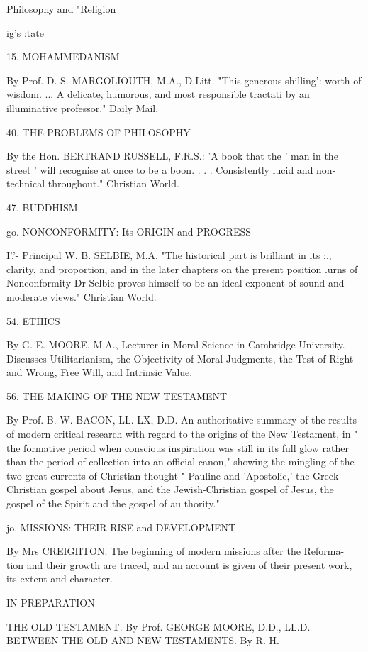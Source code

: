 \documentclass[12pt,leqno]{book}[2005/09/16]
\begin{document}
Philosophy and "Religion



ig's
:tate



15. MOHAMMEDANISM

By Prof. D. S. MARGOLIOUTH, M.A., D.Litt. "This generous shilling':
worth of wisdom. ... A delicate, humorous, and most responsible tractati
by an illuminative professor." Daily Mail.

40. THE PROBLEMS OF PHILOSOPHY

By the Hon. BERTRAND RUSSELL, F.R.S.: 'A book that the ' man in the
street ' will recognise at once to be a boon. . . . Consistently lucid and non-
technical throughout." Christian World.

47. BUDDHISM



go. NONCONFORMITY: Its ORIGIN and PROGRESS

I'.'- Principal W. B. SELBIE, M.A. "The historical part is brilliant in its
:., clarity, and proportion, and in the later chapters on the present position
.urns of Nonconformity Dr Selbie proves himself to be an ideal exponent
of sound and moderate views." Christian World.

54. ETHICS

By G. E. MOORE, M.A., Lecturer in Moral Science in Cambridge University.
Discusses Utilitarianism, the Objectivity of Moral Judgments, the Test of
Right and Wrong, Free Will, and Intrinsic Value.

56. THE MAKING OF THE NEW TESTAMENT

By Prof. B. W. BACON, LL. LX, D.D. An authoritative summary of the results
of modern critical research with regard to the origins of the New Testament, in
" the formative period when conscious inspiration was still in its full glow rather
than the period of collection into an official canon," showing the mingling of the
two great currents of Christian thought " Pauline and 'Apostolic,' the Greek-
Christian gospel about Jesus, and the Jewish-Christian gospel of Jesus, the
gospel of the Spirit and the gospel of au thority."

jo. MISSIONS: THEIR RISE and DEVELOPMENT

By Mrs CREIGHTON. The beginning of modern missions after the Reforma-
tion and their growth are traced, and an account is given of their present
work, its extent and character.

IN PREPARATION

THE OLD TESTAMENT. By Prof. GEORGE MOORE, D.D., LL.D.
BETWEEN THE OLD AND NEW TESTAMENTS. By R. H.
\end{document}
